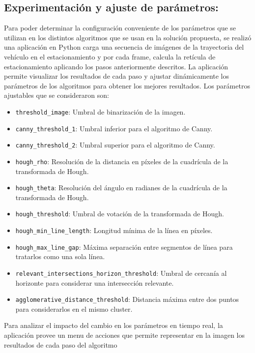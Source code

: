 \subsection{Experimentación y ajuste de parámetros:}\label{subsec:experimentacion-y-ajuste-de-parametros:}
Para poder determinar la configuración conveniente de los parámetros que se utilizan en los distintos algoritmos que se usan en la solución propuesta,
se realizó una aplicación en Python carga una secuencia de imágenes de la trayectoria del vehículo en el estacionamiento y por cada frame,
calcula la retícula de estacionamiento aplicando los pasos anteriormente descritos.
La aplicación permite visualizar los resultados de cada paso y ajustar dinámicamente los parámetros de los algoritmos para obtener los mejores resultados.
Los parámetros ajustables que se consideraron son:
\begin{itemize}
    \item \texttt{threshold\_image}: Umbral de binarización de la imagen.
    \item \texttt{canny\_threshold\_1}: Umbral inferior para el algoritmo de Canny.
    \item \texttt{canny\_threshold\_2}: Umbral superior para el algoritmo de Canny.
    \item \texttt{hough\_rho}: Resolución de la distancia en píxeles de la cuadrícula de la transformada de Hough.
    \item \texttt{hough\_theta}: Resolución del ángulo en radianes de la cuadrícula de la transformada de Hough.
    \item \texttt{hough\_threshold}: Umbral de votación de la transformada de Hough.
    \item \texttt{hough\_min\_line\_length}: Longitud mínima de la línea en píxeles.
    \item \texttt{hough\_max\_line\_gap}: Máxima separación entre segmentos de línea para tratarlos como una sola línea.
    \item \texttt{relevant\_intersections\_horizon\_threshold}: Umbral de cercanía al horizonte para considerar una intersección relevante.
    \item \texttt{agglomerative\_distance\_threshold}: Distancia máxima entre dos puntos para considerarlos en el mismo cluster.
\end{itemize}
Para analizar el impacto del cambio en los parámetros en tiempo real, la aplicación provee un menu de acciones que permite
representar en la imagen los resultados de cada paso del algoritmo

